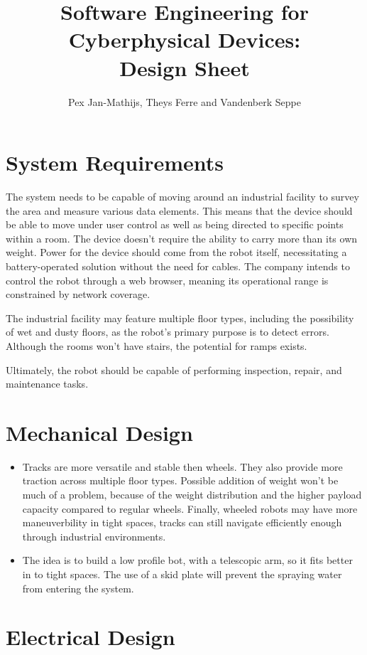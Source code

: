 \documentclass[a4paper]{article}
\title{Software Engineering for Cyberphysical Devices: \\ Design Sheet}
\author{Pex Jan-Mathijs, Theys Ferre and Vandenberk Seppe}
\date{}
\begin{document}
\maketitle

\section*{System Requirements}

The system needs to be capable of moving around an industrial facility to survey the area and measure various data elements. This means that the device should be able to move under user control as well as being directed to specific points within a room. The device doesn't require the ability to carry more than its own weight. Power for the device should come from the robot itself, necessitating a battery-operated solution without the need for cables. The company intends to control the robot through a web browser, meaning its operational range is constrained by network coverage.

The industrial facility may feature multiple floor types, including the possibility of wet and dusty floors, as the robot's primary purpose is to detect errors. Although the rooms won't have stairs, the potential for ramps exists.

Ultimately, the robot should be capable of performing inspection, repair, and maintenance tasks.

\section*{Mechanical Design}

\begin{itemize}
\item Tracks are more versatile and stable then wheels. They also provide more traction across multiple floor types. Possible addition of weight won't be much of a problem, because of the weight distribution and the higher payload capacity compared to regular wheels. Finally, wheeled robots may have more maneuverbility in tight spaces, tracks can still navigate efficiently enough through industrial environments. 
\item The idea is to build a low profile bot, with a telescopic arm, so it fits better in to tight spaces. The use of a skid plate will prevent the spraying water from entering the system.
\end{itemize}

\section*{Electrical Design}
\end{document}
